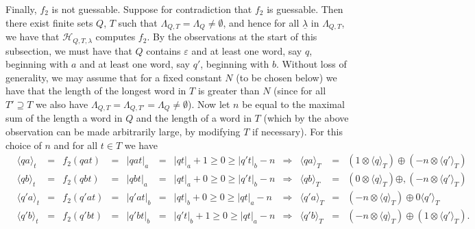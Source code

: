 \documentclass[10pt,a4paper]{amsart}
\theoremstyle{definition}
\numberwithin{equation}{section}
\numberwithin{theorem}{section}
\begin{document}
		Finally, $f_2$ is not guessable. Suppose for contradiction that $f_2$ is guessable. Then there exist finite sets $Q$, $T$ such that $\Lambda_{Q, T} = \Lambda_Q \neq \emptyset$, and hence for all $\underline{\lambda}$ in $\Lambda_{Q,T}$, we have that $\mathcal{H}_{Q,T,\lambda}$ computes $f_2$. By the observations at the start of this subsection, we must have that $Q$ contains $\varepsilon$ and at least one word, say $q$, beginning with $a$ and at least one word, say $q'$,  beginning with $b$. Without loss of generality, we may assume that for a fixed constant $N$ (to be chosen below) we have that the length of the longest word in $T$ is greater than $N$ (since for all $T' \supseteq T$ we also have $\Lambda_{Q, T} = \Lambda_{Q, T'}= \Lambda_Q \neq \emptyset$). Now let $n$ be equal to the maximal sum of the length a word in $Q$ and the length of a word in $T$ (which by the above observation can be made arbitrarily large, by modifying $T$ if necessary). For this choice of $n$ and for all $t \in T$ we have
		\begin{align*} %
		&\langle qa \rangle_t \!\!\!&=& f_2(qat) \!\!\!&=& |qat|_a \!\!\!&=& |qt|_a +1 \geq 0 \geq |q't|_b - n \!\!\!&\Rightarrow& \langle qa \rangle_T  \!\!\!&=& (1 \otimes \langle q \rangle_T) \oplus (-n \otimes \langle q' \rangle_T)\\
		&\langle qb \rangle_t \!\!\!&=& f_2(qbt) \!\!\!&=& |qbt|_a \!\!\!&=& |qt|_a + 0  \geq 0 \geq |q't|_b - n \!\!\!&\Rightarrow& \langle qb \rangle_T \!\!\!&=& (0 \otimes \langle q \rangle_T) \oplus, (-n \otimes \langle q' \rangle_T)\\
		&\langle q'a \rangle_t \!\!\!&=& f_2(q'at) \!\!\!&=& |q'at|_b \!\!\!&=& |qt|_b +0 \geq 0 \geq |qt|_a - n \!\!\!&\Rightarrow& \langle q'a \rangle_T \!\!\!&=& (-n \otimes \langle q \rangle_T) \oplus 0 \langle q' \rangle_T\\
		&\langle q'b \rangle_t \!\!\!&=& f_2(q'bt) \!\!\!&=& |q'bt|_b \!\!\!&=& |q't|_b +1 \geq 0 \geq |qt|_a-n \!\!\!&\Rightarrow& \langle q'b \rangle_T \!\!\!&=& (-n \otimes \langle q \rangle_T) \oplus (1 \otimes\langle q' \rangle_T).
		\end{align*}
\end{document}
